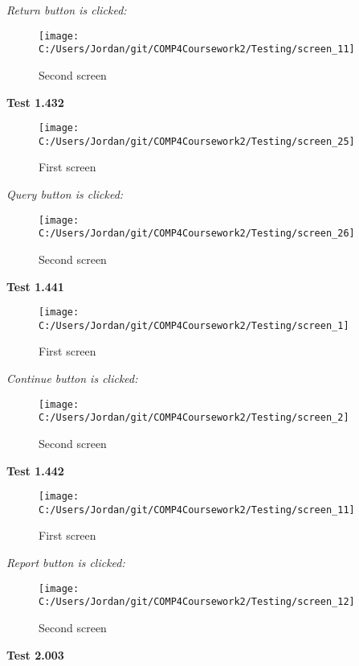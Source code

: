 \textit{Return button is clicked: }

\begin{figure}[H]
    \label{fig: Second Screen}\caption{Second screen}
    \texttt{[image: C:/Users/Jordan/git/COMP4Coursework2/Testing/screen\_11]}
\end{figure}

\textbf{Test 1.432}

\begin{figure}[H]
    \label{fig: First Screen}\caption{First screen}
    \texttt{[image: C:/Users/Jordan/git/COMP4Coursework2/Testing/screen\_25]}
\end{figure}

\textit{Query button is clicked: }

\begin{figure}[H]
    \label{fig: Second Screen}\caption{Second screen}
    \texttt{[image: C:/Users/Jordan/git/COMP4Coursework2/Testing/screen\_26]}
\end{figure}

\textbf{Test 1.441}

\begin{figure}[H]
    \label{fig: First Screen}\caption{First screen}
    \texttt{[image: C:/Users/Jordan/git/COMP4Coursework2/Testing/screen\_1]}
\end{figure}

\textit{Continue button is clicked: }

\begin{figure}[H]
    \label{fig: Second Screen}\caption{Second screen}
    \texttt{[image: C:/Users/Jordan/git/COMP4Coursework2/Testing/screen\_2]}
\end{figure}

\textbf{Test 1.442}

\begin{figure}[H]
    \label{fig: First Screen}\caption{First screen}
    \texttt{[image: C:/Users/Jordan/git/COMP4Coursework2/Testing/screen\_11]}
\end{figure}

\textit{Report button is clicked: }

\begin{figure}[H]
    \label{fig: Second Screen}\caption{Second screen}
    \texttt{[image: C:/Users/Jordan/git/COMP4Coursework2/Testing/screen\_12]}
\end{figure}

\textbf{Test 2.003}

